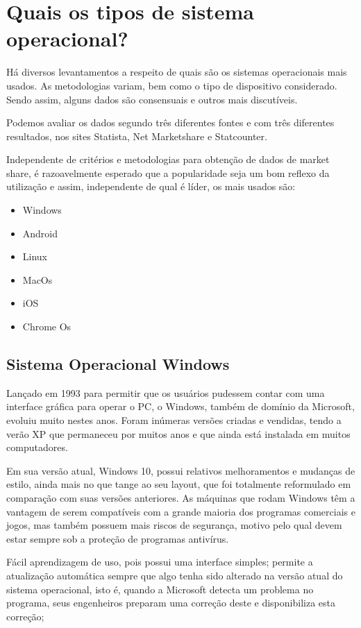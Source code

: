 \section{Quais os tipos de sistema operacional?}

Há diversos levantamentos a respeito de quais são os sistemas operacionais mais usados. As metodologias variam, bem como o tipo de dispositivo considerado. Sendo assim, alguns dados são consensuais e outros mais discutíveis.

Podemos avaliar os dados segundo três diferentes fontes e com três diferentes resultados, nos sites Statista, Net Marketshare e Statcounter.

Independente de critérios e metodologias para obtenção de dados de market share, é razoavelmente esperado que a popularidade seja um bom reflexo da utilização e assim, independente de qual é líder, os mais usados são:

\begin{itemize}
\item Windows
\item Android
\item Linux
\item MacOs
\item iOS
\item Chrome Os
\end{itemize}

\subsection{Sistema Operacional Windows}

Lançado em 1993 para permitir que os usuários pudessem contar com uma interface gráfica para operar o PC, o Windows, também de domínio da Microsoft, evoluiu muito nestes anos. Foram inúmeras versões criadas e vendidas, tendo a verão XP que permaneceu por muitos anos e que ainda está instalada em muitos computadores.

Em sua versão atual, Windows 10, possui relativos melhoramentos e mudanças de estilo, ainda mais no que tange ao seu layout, que foi totalmente reformulado em comparação com suas versões anteriores. As máquinas que rodam Windows têm a vantagem de serem compatíveis com a grande maioria dos programas comerciais e jogos, mas também possuem mais riscos de segurança, motivo pelo qual devem estar sempre sob a proteção de programas antivírus.

Fácil aprendizagem de uso, pois possui uma interface simples; permite a atualização automática sempre que algo tenha sido alterado na versão atual do sistema operacional, isto é, quando a Microsoft detecta um problema no programa, seus engenheiros preparam uma correção deste e disponibiliza esta correção;


